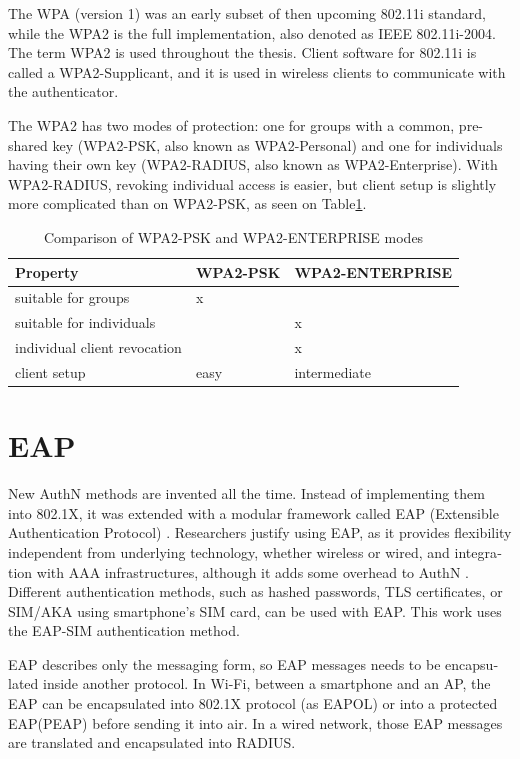 \documentclass[12pt,a4paper,english]{tutthesis}
\begin{document}
\begin{otherlanguage}{english}
The WPA (version 1)  was an early subset of then upcoming 802.11i standard,
while the WPA2 is the full implementation, also denoted as IEEE
802.11i-2004. The term WPA2 is used throughout the thesis.
Client software for 802.11i is called a WPA2-Supplicant, and it is used
in wireless clients to communicate with the authenticator. 

The WPA2 has two modes of protection: one for groups with a common, pre-shared
key (WPA2-PSK, also known as WPA2-Personal) and one for individuals
having their own key (WPA2-RADIUS, also known as  WPA2-Enterprise).  With
WPA2-RADIUS, revoking
individual access is easier, but client setup is slightly more
complicated than on WPA2-PSK, as seen on Table\ref{psk-enterprise}.

\begin{table}[htb]
\caption{\label{psk-enterprise}Comparison of WPA2-PSK and WPA2-ENTERPRISE modes}
\centering
\begin{tabular}{l|l|l}
Property & WPA2-PSK & WPA2-ENTERPRISE\\
\hline
suitable for groups & x & \\
suitable for individuals &  & x\\
individual client revocation &  & x\\
client setup & easy & intermediate\\
\hline
\end{tabular}
\end{table}


\section{EAP}
\label{sec-2-4}

New AuthN methods are invented all the time.
Instead of implementing them into 802.1X, it was 
extended with a modular framework called 
 EAP (Extensible Authentication Protocol) \cite{rfc5247}. 
Researchers justify using EAP, as it
provides flexibility independent from underlying technology, whether
wireless or wired,  and integration with AAA infrastructures, although
it adds some overhead to AuthN \cite{pereniguez10}.
Different authentication methods, such as  hashed passwords, TLS
 certificates, or SIM/AKA using smartphone's SIM card,  can
be used with EAP.
This work uses the EAP-SIM authentication method.


EAP describes only the messaging form, so EAP messages needs to
be encapsulated inside another protocol.  In Wi-Fi, between a smartphone
and an AP, the EAP can be encapsulated into 802.1X protocol (as EAPOL) or
into a protected EAP(PEAP) \cite{peap} before sending
it into air. In a wired network, those EAP messages are translated and encapsulated into RADIUS.


\end{otherlanguage}
\end{document}
